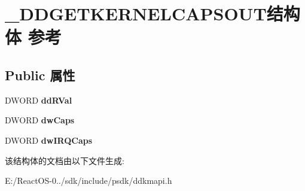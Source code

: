 \hypertarget{struct___d_d_g_e_t_k_e_r_n_e_l_c_a_p_s_o_u_t}{}\section{\+\_\+\+D\+D\+G\+E\+T\+K\+E\+R\+N\+E\+L\+C\+A\+P\+S\+O\+U\+T结构体 参考}
\label{struct___d_d_g_e_t_k_e_r_n_e_l_c_a_p_s_o_u_t}
\subsection*{Public 属性}
\begin{DoxyCompactItemize}
\item 
\mbox{\label{struct___d_d_g_e_t_k_e_r_n_e_l_c_a_p_s_o_u_t_a9dd48fa59f9773bd28d0229a53ba67ba}} 
D\+W\+O\+RD {\bfseries dd\+R\+Val}
\item 
\mbox{\label{struct___d_d_g_e_t_k_e_r_n_e_l_c_a_p_s_o_u_t_ac30a777f572cc73c711069685fce0469}} 
D\+W\+O\+RD {\bfseries dw\+Caps}
\item 
\mbox{\label{struct___d_d_g_e_t_k_e_r_n_e_l_c_a_p_s_o_u_t_a762ae2bee10678d9430aadb3ba0f4aff}} 
D\+W\+O\+RD {\bfseries dw\+I\+R\+Q\+Caps}
\end{DoxyCompactItemize}


该结构体的文档由以下文件生成\+:\begin{DoxyCompactItemize}
\item 
E\+:/\+React\+O\+S-\/0../sdk/include/psdk/ddkmapi.\+h\end{DoxyCompactItemize}

